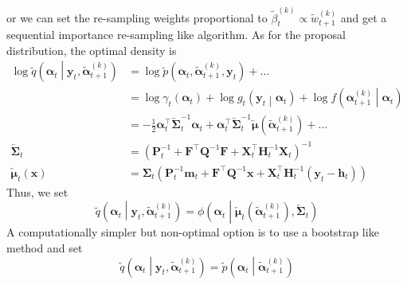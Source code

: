 \documentclass[notitlepage]{article}
\renewcommand{\vec}[1]{\bm{#1}}
\newcommand{\vecLarrow}[1]{\overleftarrow{\vec{#1}}}
\newcommand{\mat}[1]{\mathbf{#1}}
\newcommand{\matLarrow}[1]{\overleftarrow{\mat{#1}}}
\newcommand{\Lparen}[1]{\left( #1\right)}
\newcommand{\Cond}[2]{ #1 \middle\vert  #2}
\newcommand{\optor}[2]{#1\Lparen{#2}}
\newcommand{\optorC}[3]{\optor{#1}{\Cond{#2}{#3}}}
\newcommand{\pdenst}[1]{\optor{\widetilde p}{#1}}
\newcommand{\pdenstC}[2]{\optorC{\widetilde p}{#1}{#2}}
\newcommand{\normaldC}[3]{\optorC{\phi}{#1}{#2,#3}}
\newcommand{\IDAproxC}[2]{\optorC{\widetilde{q}}{#1}{#2}}
\newcommand{\partic}[3]{#1_{#2}^{\Lparen{#3}}}
\newcommand{\particB}[3]{\widetilde{#1}_{#2}^{\Lparen{#3}}}
\begin{document}
%
or we can set the re-sampling weights proportional to %
$\particB{\beta}{t}{k}\propto \particB w{t + 1}k$ and get a sequential importance re-sampling like algorithm. As for the proposal distribution, the optimal density is%
%
\begin{align*}
\log \IDAproxC{\vec\alpha_t}{\vec y_t, \particB{\vec{\alpha}}{t + 1}k}
	&= \log\pdenst{\vec\alpha_t, \particB{\vec\alpha}{t + 1}k, \vec y_t}
	+ \dots \\
	& = \log \gamma_t\Lparen{\vec{\alpha}_t}
	+ \log\optorC{g_t}{\vec y_t}{\vec{\alpha}_t}
	+ \log\optorC{f}{\partic{\vec\alpha}{t+1}k}{\vec\alpha_t} \\
	& = - \frac 12 \vec\alpha_t^\top \matLarrow\Sigma^{-1}_t\vec\alpha_t
		+ \vec\alpha_t^\top \matLarrow\Sigma_t^{-1}\vecLarrow\mu(
			\particB{\vec\alpha}{t + 1}k) + \dots \\
\matLarrow\Sigma_t &= \Lparen{\mat P_t^{-1} + \mat F^\top\mat Q^{-1}\mat F + 
		\mat X_t^\top \mat H^{-1}_t \mat X_t}^{-1} \\
\vecLarrow\mu_t(\vec x) &= \mat\Sigma_t\Lparen{
	\mat P_t^{-1}\vec m_t + \mat F^\top \mat Q^{-1}\vec x + 
	\mat X_t^\top\mat H_t^{-1}(\vec y_t - \vec h_t)}
\end{align*}%
%
Thus, we set %
%
$$
\IDAproxC{\vec\alpha_t}{\vec y_t, \particB{\vec{\alpha}}{t + 1}k} = 
\normaldC{\vec\alpha_t}{
		\vecLarrow\mu_t(\particB{\vec{\alpha}}{t + 1}k)}{
		\matLarrow\Sigma_t}
$$%
% 
A computationally simpler but non-optimal option is to use a bootstrap like method and set%
%
$$
\IDAproxC{\vec\alpha_t}{\vec y_t, \particB{\vec{\alpha}}{t + 1}k} = 
	\pdenstC{\vec{\alpha}_t}{\particB{\vec{\alpha}}{t + 1}k}
$$
\end{document}
